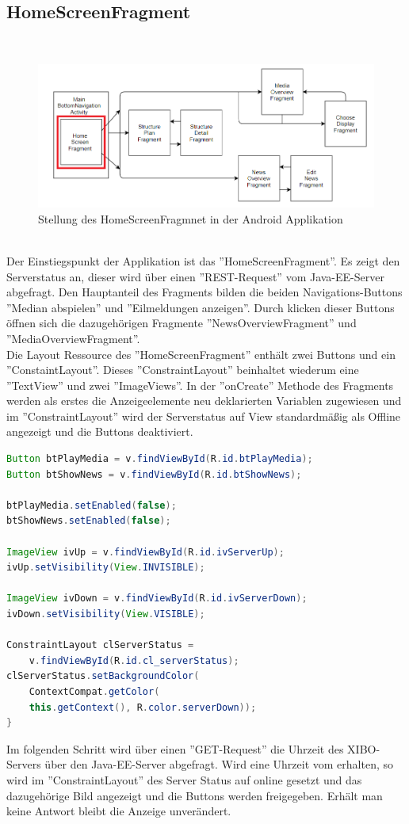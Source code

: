 \subsection{HomeScreenFragment}
\\
\begin{figure}[H]
\centering
\includegraphics[width=1.0\textwidth]{images/06_AndroidApp/06_AndroidArchHomeScreen}
\caption{Stellung des HomeScreenFragmnet in der Android Applikation}
\label{fig:mediaNav}
\end{figure}
\\
Der Einstiegspunkt der Applikation ist das ''HomeScreenFragment''. Es zeigt den Serverstatus an, dieser wird über einen ''REST-Request'' vom Java-EE-Server abgefragt. Den Hauptanteil des Fragments bilden die beiden Navigations-Buttons ''Median abspielen'' und ''Eilmeldungen anzeigen''. Durch klicken dieser Buttons öffnen sich die dazugehörigen Fragmente ''NewsOverviewFragment'' und ''MediaOverviewFragment''.
\\
Die Layout Ressource des ''HomeScreenFragment'' enthält zwei Buttons und ein ''ConstaintLayout''. Dieses ''ConstraintLayout'' beinhaltet wiederum eine ''TextView'' und zwei ''ImageViews''. In der ''onCreate'' Methode des Fragments werden als erstes die Anzeigeelemente neu deklarierten Variablen zugewiesen und im ''ConstraintLayout'' wird der Serverstatus auf View standardmäßig als Offline angezeigt und die Buttons deaktiviert.
\begin{lstlisting}[language=Java,caption={Initialisieren der Variablen im HomeScreenFragment }]
Button btPlayMedia = v.findViewById(R.id.btPlayMedia);
Button btShowNews = v.findViewById(R.id.btShowNews);

btPlayMedia.setEnabled(false);
btShowNews.setEnabled(false);
    
ImageView ivUp = v.findViewById(R.id.ivServerUp);
ivUp.setVisibility(View.INVISIBLE);
    
ImageView ivDown = v.findViewById(R.id.ivServerDown);    
ivDown.setVisibility(View.VISIBLE);
    
ConstraintLayout clServerStatus = 
    v.findViewById(R.id.cl_serverStatus);
clServerStatus.setBackgroundColor(
    ContextCompat.getColor(
    this.getContext(), R.color.serverDown));
}
\end{lstlisting}
Im folgenden Schritt wird über einen ''GET-Request'' die Uhrzeit des XIBO-Servers über den Java-EE-Server abgefragt. Wird eine Uhrzeit vom erhalten, so wird im ''ConstraintLayout'' des Server Status auf online gesetzt und das dazugehörige Bild angezeigt und die Buttons werden freigegeben. Erhält man keine Antwort bleibt die Anzeige unverändert.

